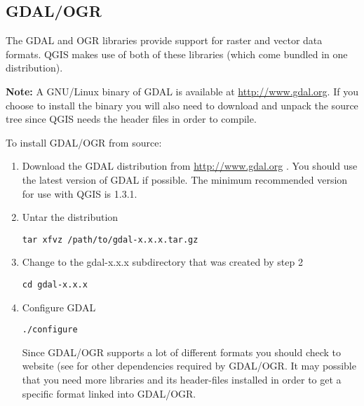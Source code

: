 %
%
\subsection{GDAL/OGR}\label{label_gdal}

The GDAL and OGR libraries provide support for raster and vector data
formats. QGIS makes use of both of these libraries (which come bundled in
one distribution).

\textbf{Note:} A GNU/Linux binary of GDAL is available at
\url{http://www.gdal.org}. If you choose to install the
binary you will also need to download and unpack the source tree since QGIS
needs the header files in order to compile.
  
To install GDAL/OGR from source:

\begin{enumerate}
\item Download the GDAL distribution from
\url{http://www.gdal.org} \cite{OGRweb}. You should use the latest
version of GDAL if possible. The minimum recommended version for use
with QGIS \CURRENT is 1.3.1. 

\item Untar the distribution 
\begin{verbatim}
tar xfvz /path/to/gdal-x.x.x.tar.gz
\end{verbatim}

\item Change to the gdal-x.x.x subdirectory that was created by step 2
\begin{verbatim}
cd gdal-x.x.x
\end{verbatim}

\item Configure GDAL
\begin{verbatim}
./configure 
\end{verbatim}
Since GDAL/OGR supports a lot of different formats you should check to website (see \cite{OGRweb} for other dependencies required by GDAL/OGR. It may possible that
you need more libraries and its header-files installed in order to get a 
specific format linked into GDAL/OGR.



\end{enumerate}
